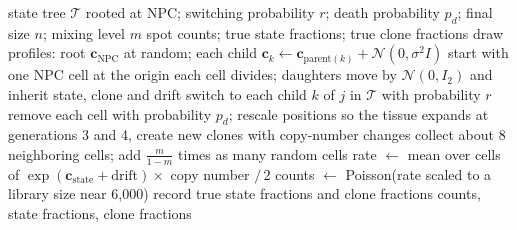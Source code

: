 \documentclass[11pt]{article}
\begin{document}
\begin{algorithm}[h]
\caption{\textbf{Spatial simulator with a known lineage (forward mode).} Grows a tissue along a chosen state tree and produces Visium-like spots with known state and clone fractions.}
\begin{algorithmic}
\Require state tree $\mathcal{T}$ rooted at NPC; switching probability $r$; death probability $p_d$; final size $n$; mixing level $m$
\Ensure spot counts; true state fractions; true clone fractions
\State draw profiles: root $\mathbf{c}_{\mathrm{NPC}}$ at random; each child $\mathbf{c}_k \gets \mathbf{c}_{\mathrm{parent}(k)} + \mathcal{N}(0, \sigma^2 I)$
\State start with one NPC cell at the origin
  \State each cell divides; daughters move by $\mathcal{N}(0, I_2)$ and inherit state, clone and drift
    \State switch to each child $k$ of $j$ in $\mathcal{T}$ with probability $r$
  \EndFor
  \State remove each cell with probability $p_d$; rescale positions so the tissue expands
    \State at generations 3 and 4, create new clones with copy-number changes 
\EndWhile
{}
  \State collect about 8 neighboring cells; add $\frac{m}{1-m}$ times as many random cells 
  \State rate $\gets$ mean over cells of $\exp(\mathbf{c}_{\mathrm{state}} + \text{drift}) \times$ copy number $/\,2$
  \State counts $\gets$ Poisson(rate scaled to a library size near 6,000)
  \State record true state fractions and clone fractions
\EndFor
\State \Return counts, state fractions, clone fractions
\end{algorithmic}
\end{algorithm}
\end{document}
